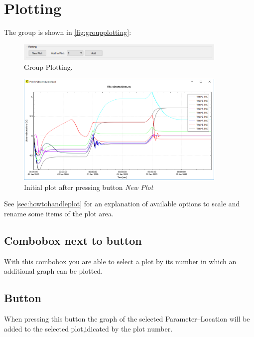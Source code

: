 \documentclass{deltares_memo}
\begin{document}
\section{Plotting}
The group  is shown in \autoref{fig:groupplotting}:
\begin{figure}[H]
    \centering    
    \includegraphics[width=0.9\textwidth]{pictures/group_plotting.png}
    \caption{Group Plotting. \label{fig:groupplotting}}
\end{figure}
\begin{figure}[H]
    \centering    
    \includegraphics[width=0.9\textwidth]{pictures/plot.png}
    \caption{Initial plot after pressing button \emph{New Plot}}
\end{figure}
See \autoref{sec:howtohandleplot} for an explanation of available options to scale and rename some items of the plot area.
\subsection{Combobox next to button }
With this combobox you are able to select a plot by its number in which an additional graph can be plotted.

\subsection{Button }
When pressing this button the graph of the selected Parameter--Location will be added to the selected plot,idicated by the plot number.
\end{document}
